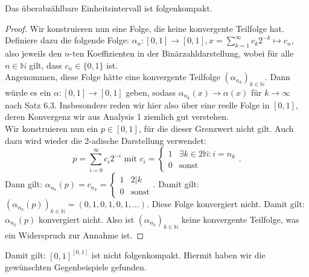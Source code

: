 \documentclass[11pt]{scrartcl}
\newcommand{\N}{\mathbb{N}}
\begin{document}
\begin{theorem}
	Das überabzählbare Einheitsintervall ist folgenkompakt.
\end{theorem}
\begin{proof}
	Wir konstruieren nun eine Folge, die keine konvergente Teilfolge hat. Definiere dazu die folgende Folge:
	$\alpha_n: [0,1]\rightarrow [0,1], x = \sum_{k=1}^\infty c_k 2^{-k} \mapsto c_n$, also jeweils den $n$-ten
	Koeffizienten in der Binärzahldarstellung, wobei für alle $n\in\N$ gilt, dass $c_n \in \{ 0,1\}$ ist.\\
	Angenommen, diese Folge hätte eine konvergente Teilfolge $(\alpha_{n_k})_{k\in\mathbb N}$. Dann würde es ein $\alpha:[0,1]\rightarrow[0,1]$
	geben, sodass $\alpha_{n_k}(x)\rightarrow \alpha(x)$ für $k\rightarrow \infty$ nach Satz 6.3. Insbesondere reden wir hier also über eine reelle Folge
	in $[0,1]$, deren Konvergenz wir aus Analysis 1 ziemlich gut verstehen.\\
	Wir konstruieren nun ein $p\in [0,1]$, für die dieser Grenzwert nicht gilt. Auch dazu wird wieder die 2-adische Darstellung verwendet: $$p= \sum_{i=0}^\infty c_i 2^{-i} \textrm{ mit } c_i=\begin{cases}
		1 & \exists k\in 2\N: i=n_k\\
		0 & \textrm{sonst}
	\end{cases}.$$ 
	Dann gilt: $\alpha_{n_k}(p)= c_{n_k}=\begin{cases}1&2|k\\0&\textrm{sonst}\end{cases}$. Damit gilt: $(\alpha_{n_k}(p))_{k\in\mathbb N}=(0,1,0,1,0,1,...)$. Diese Folge konvergiert nicht. Damit gilt: $\alpha_{n_k}(p)$
	konvergiert nicht. Also ist $(\alpha_{n_k})_{k\in\mathbb N}$ keine konvergente Teilfolge, was ein Widerspruch zur Annahme ist.
\end{proof}
Damit gilt: $[0,1]^{[0,1]}$ ist nicht folgenkompakt. Hiermit haben wir die gewünschten Gegenbeispiele gefunden.
\end{document}
